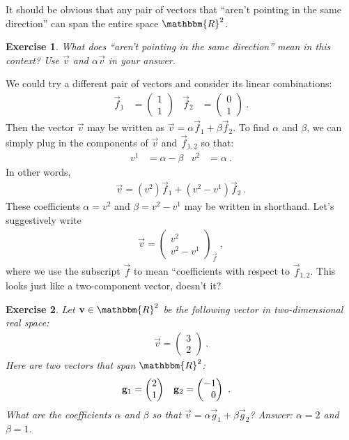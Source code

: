 \documentclass[12pt]{article}
\newtheorem{exercise}{Exercise}[section]
\begin{document}
It should be obvious that any pair of vectors that ``aren't pointing in the same direction'' can span the entire space $\mathbbm{R}^2$. 
\begin{exercise}
What does ``aren't pointing in the same direction'' mean in this context? Use $\vec{v}$ and $\alpha\vec{v}$ in your answer.
\end{exercise}
We could try a different pair of vectors and consider its linear combinations:
\begin{align}
    \vec{f}_1 &=
    \begin{pmatrix}
        1\\1
    \end{pmatrix}
    &
    \vec{f}_2 &=
    \begin{pmatrix}
        0\\1
    \end{pmatrix} \ .
\end{align}
Then the vector $\vec{v}$ may be written as $\vec{v} = \alpha \vec{f}_1+ \beta\vec{f}_2$. To find $\alpha$ and $\beta$, we can simply plug in the components of $\vec{v}$ and $\vec{f}_{1,2}$ so that:
\begin{align}
    v^1 &= \alpha -\beta
    &
    v^2 &= \alpha \ .
\end{align}
In other words,
\begin{align}
    \vec{v} = (v^2) \vec{f}_1 + (v^2 - v^1)\vec{f}_2 \ .
\end{align}
These coefficients $\alpha = v^2$ and $\beta = v^2 - v^1$ may be written  in shorthand. Let's suggestively write
\begin{align}
    \vec{v} = 
    \begin{pmatrix}
        v^2\\
        v^2 - v^1
    \end{pmatrix}_{\vec{f}} \ ,
\end{align}
where we use the subscript $\vec{f}$ to mean ``coefficients with respect to $\vec{f}_{1,2}$. This looks just like a two-component vector, doesn't it?

\begin{exercise}
Let $\vec{v} \in \mathbbm{R}^2$ be the following vector in two-dimensional real space:
\begin{align}
    \vec{v}=
    \begin{pmatrix}
        3\\2
    \end{pmatrix} \ .
\end{align}
Here are two vectors that span $\mathbbm{R}^2$:
\begin{align}
    \vec{g}_1 &=
    \begin{pmatrix}
        2\\1
    \end{pmatrix}
    &
    \vec{g}_2 &=
    \begin{pmatrix}
        -1\\ \pp 0
    \end{pmatrix} \ .
\end{align}
What are the coefficients $\alpha$ and $\beta$ so that $\vec{v} = \alpha \vec{g}_1 + \beta \vec{g}_2$?  \emph{Answer}: $\alpha = 2$ and $\beta = 1$. 
\end{exercise}
\end{document}
